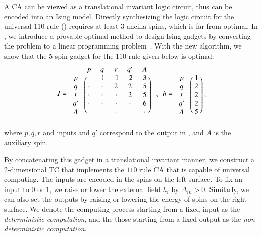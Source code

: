 \documentclass[twocolumn,superscriptaddress,english,showpacs,longbibliography]{revtex4-2}
\newcommand{\jinguo}[1]{[{\color{blue}{JGL: #1}}]}
\newcommand{\ym}[1]{[{\color{red}{YM: #1}}]}
\begin{document}
A CA can be viewed as a translational invariant logic circuit, thus can be encoded into an Ising model.
Directly synthesizing the logic circuit for the universal $110$ rule () requires at least 3 ancilla spins, which is far from optimal.
In , we introduce a provable optimal method to design Ising gadgets by converting the problem to a linear programming problem~\cite{Kolman1995}.
With the new algorithm, we show that the $5$-spin gadget for the $110$ rule given below is optimal:
\begin{equation}
J = \begin{blockarray}{cccccc}
& p & q & r & q^\prime & A\\
\begin{block}{c(ccccc)}
p & ~\cdot~ & ~1~ & ~1~ & ~2~ & ~3~\\
q & \cdot & \cdot & 2 & 2 & 5\\
r & \cdot & \cdot & \cdot & 2 & 5\\
q^\prime & \cdot & \cdot & \cdot & \cdot & 6\\
A & \cdot & \cdot & \cdot & \cdot & \cdot\\
\end{block}
\end{blockarray}
~~, ~~h = \begin{blockarray}{cc}
& \phantom{x} \\
\begin{block}{c(c)}
p & ~1~\\
q & 2\\
r & 2\\
q^\prime & 2\\
A & 5\\
\end{block}
\end{blockarray},
\end{equation}
where $p, q, r$ and inputs and $q'$ correspond to the output in , and $A$ is the auxiliary spin.

By concatenating this gadget in a translational invariant manner, we construct a 2-dimensional TC that implements the $110$ rule CA that is capable of universal computing.
The inputs are encoded in the spins on the left surface.
To fix an input to $0$ or $1$, we raise or lower the external field $h_i$ by $\Delta_{in}>0$.
Similarly, we can also set the outputs by raising or lowering the energy of spins on the right surface.
We denote the computing process starting from a fixed input as the \emph{deterministic computation}, and the those starting from a fixed output as the \emph{non-deterministic computation}.
\end{document}
